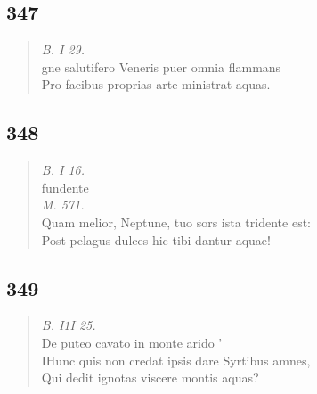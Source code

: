 \documentclass[11pt, a4paper]{report}
\begin{document}
            \subsection*{347}
      \begin{verse}
      \textit{B. I 29.} \\ gne salutifero Veneris puer omnia flammans \\ Pro facibus proprias arte ministrat aquas. \\ 
      \end{verse}
  
            \subsection*{348}
      \begin{verse}
      \textit{B. I 16.} \\ fundente \\ \textit{M. 571.} \\ Quam melior, Neptune, tuo sors ista tridente est: \\ Post pelagus dulces hic tibi dantur aquae! \\ 
      \end{verse}
  
            \subsection*{349}
      \begin{verse}
      \textit{B. I1I 25.} \\ De puteo cavato in monte arido ’ \\ IHunc quis non credat ipsis dare Syrtibus amnes, \\ Qui dedit ignotas viscere montis aquas? \\ 
      \end{verse}
  
\end{document}
